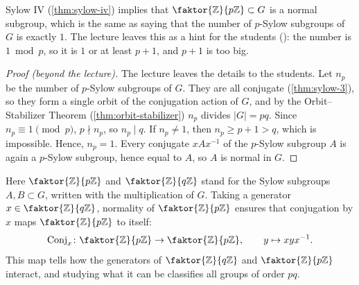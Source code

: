 \begin{content}
Sylow IV (\cref{thm:sylow-iv}) implies that $\faktor{\mathbb{Z}}{p\mathbb{Z}} \subset G$ is a normal subgroup, which is the same as saying that the number of $p$-Sylow subgroups of $G$ is exactly $1$. The lecture leaves this as a hint for the students (): the number is $1 \bmod p$, so it is $1$ or at least $p + 1$, and $p + 1$ is too big.

\begin{proof}[Proof (beyond the lecture)]
The lecture leaves the details to the students. Let $n_p$ be the number of $p$-Sylow subgroups of $G$. They are all conjugate (\cref{thm:sylow-3}), so they form a single orbit of the conjugation action of $G$, and by the Orbit--Stabilizer Theorem (\cref{thm:orbit-stabilizer}) $n_p$ divides $|G| = pq$. Since $n_p \equiv 1 \pmod p$, $p \nmid n_p$, so $n_p \mid q$. If $n_p \neq 1$, then $n_p \ge p + 1 > q$, which is impossible. Hence, $n_p = 1$. Every conjugate $x A x^{-1}$ of the $p$-Sylow subgroup $A$ is again a $p$-Sylow subgroup, hence equal to $A$, so $A$ is normal in $G$.
\end{proof}

Here $\faktor{\mathbb{Z}}{p\mathbb{Z}}$ and $\faktor{\mathbb{Z}}{q\mathbb{Z}}$ stand for the Sylow subgroups $A, B \subset G$, written with the multiplication of $G$. Taking a generator $x \in \faktor{\mathbb{Z}}{q\mathbb{Z}}$, normality of $\faktor{\mathbb{Z}}{p\mathbb{Z}}$ ensures that conjugation by $x$ maps $\faktor{\mathbb{Z}}{p\mathbb{Z}}$ to itself:
\[
\operatorname{Conj}_x \colon \faktor{\mathbb{Z}}{p\mathbb{Z}} \to \faktor{\mathbb{Z}}{p\mathbb{Z}}, \qquad y \mapsto x y x^{-1}.
\]
This map tells how the generators of $\faktor{\mathbb{Z}}{q\mathbb{Z}}$ and $\faktor{\mathbb{Z}}{p\mathbb{Z}}$ interact, and studying what it can be classifies all groups of order $p q$.
\end{content}

